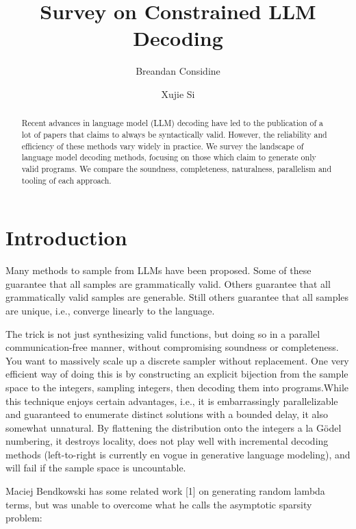 \documentclass[sigplan,nonacm]{acmart}\settopmatter{printfolios=false,printccs=false,printacmref=false}
\begin{document}
  \title{Survey on Constrained LLM Decoding}
  \begin{abstract}
    Recent advances in language model (LLM) decoding have led to the publication of a lot of papers that claims to always be syntactically valid. However, the reliability and efficiency of these methods vary widely in practice. We survey the landscape of language model decoding methods, focusing on those which claim to generate only valid programs. We compare the soundness, completeness, naturalness, parallelism and tooling of each approach.
  \end{abstract}

  \author{Breandan Considine}

  \author{Xujie Si}

  \maketitle


  \section{Introduction}

  Many methods to sample from LLMs have been proposed. Some of these guarantee that all samples are grammatically valid. Others guarantee that all grammatically valid samples are generable. Still others guarantee that all samples are unique, i.e., converge linearly to the language.

  The trick is not just synthesizing valid functions, but doing so in a parallel communication-free manner, without compromising soundness or completeness. You want to massively scale up a discrete sampler without replacement. One very efficient way of doing this is by constructing an explicit bijection from the sample space to the integers, sampling integers, then decoding them into programs.While this technique enjoys certain advantages, i.e., it is embarrassingly parallelizable and guaranteed to enumerate distinct solutions with a bounded delay, it also somewhat unnatural. By flattening the distribution onto the integers a la Gödel numbering, it destroys locality, does not play well with incremental decoding methods (left-to-right is currently en vogue in generative language modeling), and will fail if the sample space is uncountable.

  Maciej Bendkowski has some related work [1] on generating random lambda terms, but was unable to overcome what he calls the asymptotic sparsity problem:
\end{document}

